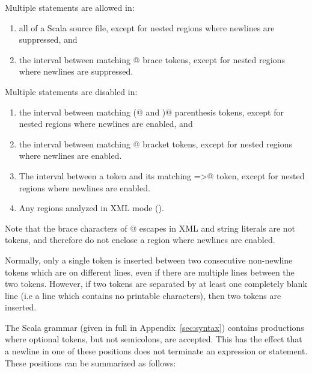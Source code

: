 Multiple statements are allowed in:
\begin{enumerate}
\item
all of a Scala source file, except for nested regions where newlines
are suppressed, and
\item
the interval between matching @ brace tokens,
except for nested regions where newlines are suppressed.
\end{enumerate}

Multiple statements are disabled in:
\begin{enumerate}
\item
the interval between matching \lstinline@(@ and \lstinline@)@ parenthesis tokens, except for nested regions where newlines are enabled, and
\item
the interval between matching @ bracket tokens,
except for nested regions where newlines are enabled.
\item
The interval between a \lstinline@case@ token and its matching
\lstinline@=>@ token, except for nested regions where newlines are
enabled.
\item Any regions analyzed in XML mode ().
\end{enumerate}
Note that the brace characters of @ escapes in XML and
string literals are not tokens, 
and therefore do not enclose a region where newlines
are enabled.

Normally, only a single  token is inserted between two
consecutive non-newline tokens which are on different lines, even if there are multiple lines
between the two tokens. However, if two tokens are separated by at
least one completely blank line (i.e a line which contains no
printable characters), then two  tokens are inserted.

The Scala grammar (given in full in Appendix~\ref{sec:syntax})
contains productions where optional  tokens, but not
semicolons, are accepted. This has the effect that a newline in one of these
positions does not terminate an expression or statement. These positions can
be summarized as follows:

